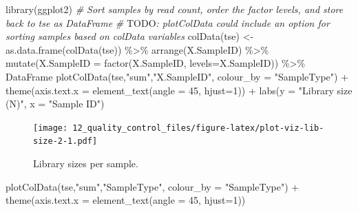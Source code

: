 \documentclass[
]{book}
\newenvironment{Shaded}{\begin{snugshade}}{\end{snugshade}}
\newcommand{\AlertTok}[1]{\textcolor[rgb]{0.94,0.16,0.16}{#1}}
\newcommand{\AttributeTok}[1]{\textcolor[rgb]{0.77,0.63,0.00}{#1}}
\newcommand{\CommentTok}[1]{\textcolor[rgb]{0.56,0.35,0.01}{\textit{#1}}}
\newcommand{\DecValTok}[1]{\textcolor[rgb]{0.00,0.00,0.81}{#1}}
\newcommand{\FunctionTok}[1]{\textcolor[rgb]{0.00,0.00,0.00}{#1}}
\newcommand{\NormalTok}[1]{#1}
\newcommand{\OtherTok}[1]{\textcolor[rgb]{0.56,0.35,0.01}{#1}}
\newcommand{\SpecialCharTok}[1]{\textcolor[rgb]{0.00,0.00,0.00}{#1}}
\newcommand{\StringTok}[1]{\textcolor[rgb]{0.31,0.60,0.02}{#1}}
\begin{document}
\begin{Shaded}
\begin{Highlighting}[]
\FunctionTok{library}\NormalTok{(ggplot2)}
\CommentTok{\# Sort samples by read count, order the factor levels, and store back to tse as DataFrame}
\CommentTok{\# }\AlertTok{TODO}\CommentTok{: plotColData could include an option for sorting samples based on colData variables}
\FunctionTok{colData}\NormalTok{(tse) }\OtherTok{\textless{}{-}} \FunctionTok{as.data.frame}\NormalTok{(}\FunctionTok{colData}\NormalTok{(tse)) }\SpecialCharTok{\%\textgreater{}\%}
                 \FunctionTok{arrange}\NormalTok{(X.SampleID) }\SpecialCharTok{\%\textgreater{}\%}
             \FunctionTok{mutate}\NormalTok{(}\AttributeTok{X.SampleID =} \FunctionTok{factor}\NormalTok{(X.SampleID, }\AttributeTok{levels=}\NormalTok{X.SampleID)) }\SpecialCharTok{\%\textgreater{}\%}
\NormalTok{         DataFrame}
\FunctionTok{plotColData}\NormalTok{(tse,}\StringTok{"sum"}\NormalTok{,}\StringTok{"X.SampleID"}\NormalTok{, }\AttributeTok{colour\_by =} \StringTok{"SampleType"}\NormalTok{) }\SpecialCharTok{+} 
    \FunctionTok{theme}\NormalTok{(}\AttributeTok{axis.text.x =} \FunctionTok{element\_text}\NormalTok{(}\AttributeTok{angle =} \DecValTok{45}\NormalTok{, }\AttributeTok{hjust=}\DecValTok{1}\NormalTok{)) }\SpecialCharTok{+}
    \FunctionTok{labs}\NormalTok{(}\AttributeTok{y =} \StringTok{"Library size (N)"}\NormalTok{, }\AttributeTok{x =} \StringTok{"Sample ID"}\NormalTok{)       }
\end{Highlighting}
\end{Shaded}

\begin{figure}
\centering
\texttt{[image: 12\_quality\_control\_files/figure-latex/plot-viz-lib-size-2-1.pdf]}
\caption{\label{fig:plot-viz-lib-size-2}Library sizes per sample.}
\end{figure}

\begin{Shaded}
\begin{Highlighting}[]
\FunctionTok{plotColData}\NormalTok{(tse,}\StringTok{"sum"}\NormalTok{,}\StringTok{"SampleType"}\NormalTok{, }\AttributeTok{colour\_by =} \StringTok{"SampleType"}\NormalTok{) }\SpecialCharTok{+} 
    \FunctionTok{theme}\NormalTok{(}\AttributeTok{axis.text.x =} \FunctionTok{element\_text}\NormalTok{(}\AttributeTok{angle =} \DecValTok{45}\NormalTok{, }\AttributeTok{hjust=}\DecValTok{1}\NormalTok{))}
\end{Highlighting}
\end{Shaded}
\end{document}
